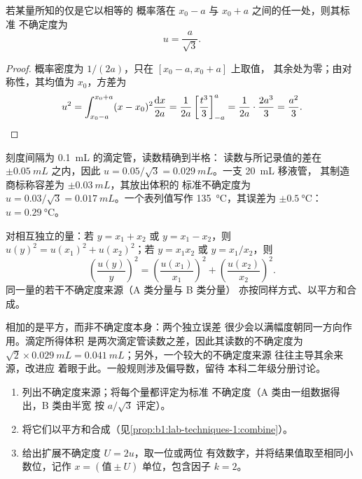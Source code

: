 \begin{proposition}\label{prop:b1:lab-techniques-1:type-b}
若某量所知的仅是它以相等的
概率落在 $x_0 - a$ 与 $x_0 + a$ 之间的任一处，则其标准
不确定度为
\[
  u = \frac{a}{\sqrt3}.
\]
\end{proposition}
\begin{proof}
概率密度为 $1/(2a)$，只在 $[x_0 - a, x_0 + a]$ 上取值，
其余处为零；由对称性，其均值为 $x_0$，方差为
\[
  u^2 = \int_{x_0-a}^{x_0+a} (x - x_0)^2 \frac{\mathrm{d}x}{2a}
      = \frac{1}{2a} \left[\frac{t^3}{3}\right]_{-a}^{a}
      = \frac{1}{2a}\cdot\frac{2a^3}{3} = \frac{a^2}{3}. \qedhere
\]
\end{proof}

\begin{example}[一次读数与容差]
刻度间隔为 \qty{0.1}{mL} 的滴定管，读数精确到半格：
读数与所记录值的差在 $\pm\qty{0.05}{mL}$ 之内，因此
$u = 0.05/\sqrt3 = \qty{0.029}{mL}$。一支 \qty{20}{mL} 移液管，
其制造商标称容差为 $\pm\qty{0.03}{mL}$，其放出体积的
标准不确定度为 $u = 0.03/\sqrt3 = \qty{0.017}{mL}$。一个表列值写作
\qty{135}{\celsius}，其误差为 $\pm\qty{0.5}{\celsius}$：$u = \qty{0.29}{\celsius}$。
\end{example}

\begin{proposition}[不确定度的合成]\label{prop:b1:lab-techniques-1:combine}
对相互独立的量：若 $y = x_1 + x_2$ 或 $y = x_1 - x_2$，则
$u(y)^2 = u(x_1)^2 + u(x_2)^2$；若 $y = x_1 x_2$ 或 $y = x_1/x_2$，则
\[
  \left(\frac{u(y)}{y}\right)^2 = \left(\frac{u(x_1)}{x_1}\right)^2
  + \left(\frac{u(x_2)}{x_2}\right)^2 .
\]
同一量的若干不确定度来源（A 类分量与 B 类分量）
亦按同样方式、以平方和合成。
\end{proposition}
\admitted

相加的是平方，而非不确定度本身：两个独立误差
很少会以满幅度朝同一方向作用。滴定所得体积
是两次滴定管读数之差，因此其读数的不确定度为
$\sqrt2 \times \qty{0.029}{mL} = \qty{0.041}{mL}$；另外，一个较大的不确定度来源
往往主导其余来源，改进应
着眼于此。一般规则涉及偏导数，留待
本科二年级分册讨论。

\begin{method}[结果的报告]\label{met:b1:lab-techniques-1:report-result}
\begin{enumerate}
  \item 列出不确定度来源；将每个量都评定为标准
        不确定度（A 类由一组数据得出，B 类由半宽
        按 $a/\sqrt3$ 评定）。
  \item 将它们以平方和合成（见\cref{prop:b1:lab-techniques-1:combine}）。
  \item 给出扩展不确定度 $U = 2u$，取一位或两位
        有效数字，并将结果值取至相同小数位，记作
        $x = (\text{值} \pm U)$ 单位，包含因子 $k = 2$。
\end{enumerate}
\end{method}

